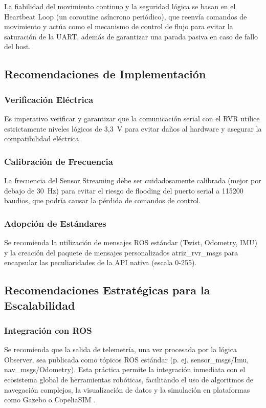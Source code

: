\documentclass[11pt]{article}
\newcommand{\code}[1]{\textcolor{codeblue}{\url{#1}}}
\numberwithin{figure}{section}
\numberwithin{table}{section}
\def\code#1{#1}%
\begin{document}
La fiabilidad del movimiento continuo y la seguridad lógica se basan en el Heartbeat Loop (un coroutine asíncrono periódico), que reenvía comandos de movimiento y actúa como el mecanismo de control de flujo para evitar la saturación de la UART, además de garantizar una parada pasiva en caso de fallo del host.


\subsection{Recomendaciones de Implementación}


\subsubsection{Verificación Eléctrica}

Es imperativo verificar y garantizar que la comunicación serial con el RVR utilice estrictamente niveles lógicos de 3,3~V para evitar daños al hardware y asegurar la compatibilidad eléctrica.


\subsubsection{Calibración de Frecuencia}

La frecuencia del Sensor Streaming debe ser cuidadosamente calibrada (mejor por debajo de 30~Hz) para evitar el riesgo de flooding del puerto serial a 115200 baudios, que podría causar la pérdida de comandos de control.


\subsubsection{Adopción de Estándares}

Se recomienda la utilización de mensajes ROS estándar (Twist, Odometry, IMU) y la creación del paquete de mensajes personalizados \code{atriz\_rvr\_msgs} para encapsular las peculiaridades de la API nativa (escala 0-255).


\subsection{Recomendaciones Estratégicas para la Escalabilidad}


\subsubsection{Integración con ROS}

Se recomienda que la salida de telemetría, una vez procesada por la lógica Observer, sea publicada como tópicos ROS estándar (p. ej. \code{sensor\_msgs/Imu}, \code{nav\_msgs/Odometry}). Esta práctica permite la integración inmediata con el ecosistema global de herramientas robóticas, facilitando el uso de algoritmos de navegación complejos, la visualización de datos y la simulación en plataformas como Gazebo \cite{KoenigHoward2004Gazebo} o CopeliaSIM \cite{RohmerSinghFreese2013VREP}.
\end{document}
